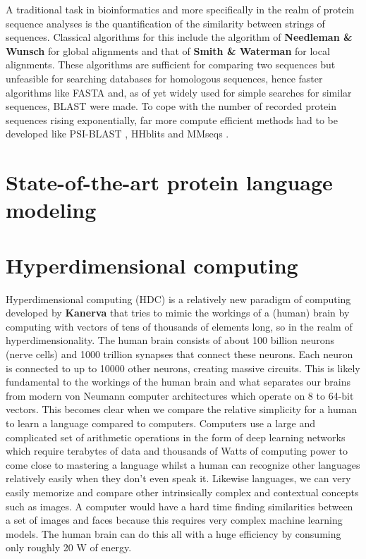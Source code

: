 A traditional task in bioinformatics and more specifically in the realm of protein sequence analyses is the quantification of the similarity between strings of sequences. Classical algorithms for this include the algorithm of \textbf{Needleman \& Wunsch} \cite{global} for global alignments and that of \textbf{Smith \& Waterman} \cite{local} for local alignments. These algorithms are sufficient for comparing two sequences but unfeasible for searching databases for homologous sequences, hence faster algorithms like FASTA \cite{fasta} and, as of yet widely used for simple searches for similar sequences, BLAST \cite{blast} were made. To cope with the number of recorded protein sequences rising exponentially, far more compute efficient methods had to be developed like PSI-BLAST \cite{psiblast}, HHblits \cite{hhblits3} and MMseqs \cite{mmseqs2}.
\section{State-of-the-art protein language modeling}

\section{Hyperdimensional computing}
Hyperdimensional computing (HDC) is a relatively new paradigm of computing developed by \textbf{Kanerva} \cite{Kanerva2009} that tries to mimic the workings of a (human) brain by computing with vectors of tens of thousands of elements long, so in the realm of hyperdimensionality. The human brain consists of about 100 billion neurons (nerve cells) and 1000 trillion synapses that connect these neurons. Each neuron is connected to up to 10000 other neurons, creating massive circuits. This is likely fundamental to the workings of the human brain and what separates our brains from modern von Neumann computer architectures which operate on 8 to 64-bit vectors. This becomes clear when we compare the relative simplicity for a human to learn a language compared to computers. Computers use a large and complicated set of arithmetic operations in the form of deep learning networks which require terabytes of data and thousands of Watts of computing power to come close to mastering a language whilst a human can recognize other languages relatively easily when they don't even speak it. Likewise languages, we can very easily memorize and compare other intrinsically complex and contextual concepts such as images. A computer would have a hard time finding similarities between a set of images and faces because this requires very complex machine learning models. The human brain can do this all with a huge efficiency by consuming only roughly 20 W of energy.


